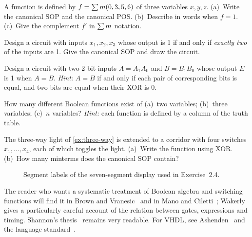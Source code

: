 \begin{exlist}
  \item A function is defined by $f=\sum m(0,3,5,6)$ of three variables $x,y,z$. (a)~Write the canonical SOP and the canonical POS. (b)~Describe in words when $f=1$. (c)~Give the complement $f'$ in $\sum m$ notation.
  \item Design a circuit with inputs $x_1,x_2,x_3$ whose output is 1 if and only if \emph{exactly two} of the inputs are 1. Give the canonical SOP and draw the circuit.
  \item Design a circuit with two 2-bit inputs $A=A_1A_0$ and $B=B_1B_0$ whose output $E$ is 1 when $A=B$. \emph{Hint:} $A=B$ if and only if each pair of corresponding bits is equal, and two bits are equal when their XOR is 0.
  \item How many different Boolean functions exist of (a)~two variables; (b)~three variables; (c)~$n$ variables? \emph{Hint:} each function is defined by a column of the truth table.
  \item The three-way light of \cref{ex:three-way} is extended to a corridor with four switches $x_1,\dots,x_4$, each of which toggles the light. (a)~Write the function using XOR. (b)~How many minterms does the canonical SOP contain?
\end{exlist}

\begin{figure}[htbp]
\centering
{}
\caption{Segment labels of the seven-segment display used in Exercise~2.4.}
\label{fig:sevenseg}
\end{figure}

The reader who wants a systematic treatment of Boolean algebra and switching functions will find it in Brown and Vranesic~\cite{brown2009} and in Mano and Ciletti~\cite{mano2018}; Wakerly~\cite{wakerly2006} gives a particularly careful account of the relation between gates, expressions and timing. Shannon's thesis~\cite{shannon1938} remains very readable. For VHDL, see Ashenden~\cite{ashenden2008} and the language standard~\cite{ieee1076}.
